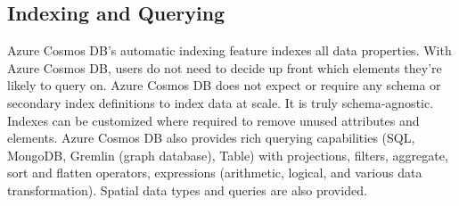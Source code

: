 \subsection{Indexing and Querying}
Azure Cosmos DB’s automatic indexing feature indexes all data
properties. With Azure Cosmos DB, users do not need to decide up front
which elements they're likely to query on. Azure Cosmos DB does not
expect or require any schema or secondary index definitions to index
data at scale. It is truly schema-agnostic. Indexes can be customized
where required to remove unused attributes and elements.  Azure Cosmos
DB also provides rich querying capabilities (SQL, MongoDB, Gremlin
(graph database), Table) with projections, filters, aggregate, sort
and flatten operators, expressions (arithmetic, logical, and various
data transformation). Spatial data types and queries are also
provided.

